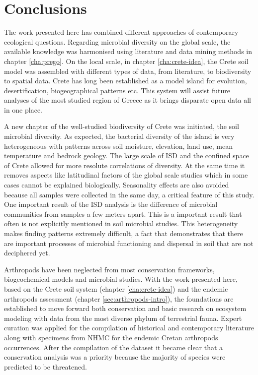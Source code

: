 % 
% 

\chapter{Conclusions}
\label{cha:conclusions}

The work presented here has combined different approaches of contemporary 
ecological questions.
Regarding microbial diversity on the global scale, the available 
knowledge was harmonised using literature and data mining methods in chapter \ref{cha:prego}.
On the local scale,
in chapter \ref{cha:crete-idea}, the Crete soil model was assembled 
with different types of data, from literature, to biodiversity to spatial data. 
Crete has long been established as a model island for evolution, desertification, biogeographical patterns etc.
This system will assist future analyses of the most studied region of Greece as 
it brings disparate open data all in one place.

A new chapter of the well-studied biodiversity of Crete was initiated, 
the soil microbial diversity.
As expected, the bacterial diversity of the island is very heterogeneous 
with patterns across soil moisture, elevation, land use, mean temperature and bedrock geology.
The large scale of ISD and the confined space of Crete allowed for more resolute 
correlations of diversity. At the same time it removes aspects like latitudinal factors
of the global scale studies which in some cases cannot be explained biologically. 
Seasonality effects are also avoided because all samples were collected in the same day, a critical
feature of this study.
One important result of the ISD analysis is the difference of microbial 
communities from samples a few meters apart. This is a important result
that often is not explicitly mentioned in soil microbial studies. This heterogeneity 
makes finding patterns extremely difficult, a fact that demonstrates that
there are important processes of microbial functioning and
dispersal in soil that are not deciphered yet.

Arthropods have been neglected from most conservation frameworks, biogeochemical models
and microbial studies. With the work presented here,
based on the Crete soil system (chapter \ref{cha:crete-idea})
and the endemic arthropods assessment (chapter \ref{sec:arthropods-intro}),
the foundations are established to move forward both 
conservation and basic research on ecosystem modeling with 
data from the most diverse phylum of terrestrial fauna.
Expert curation was applied for the compilation of historical and contemporary
literature along with specimens from NHMC for the endemic Cretan arthropods occurrences.
After the compilation of the dataset it became clear that a conservation analysis
was a priority because the majority of species were predicted to be threatened.

